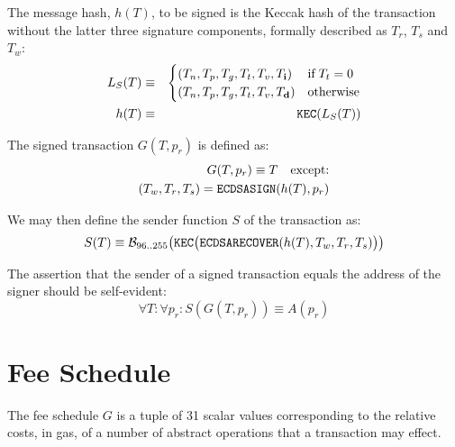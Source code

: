 \documentclass[9pt,oneside]{amsart}
\begin{document}
The message hash, $h(T)$, to be signed is the Keccak hash of the transaction without the latter three signature components, formally described as $T_r$, $T_s$ and $T_w$:
\begin{eqnarray}
L_S(T) & \equiv & \begin{cases}
(T_n, T_p, T_g, T_t, T_v, T_\mathbf{i}) & \text{if} \; T_t = 0\\
(T_n, T_p, T_g, T_t, T_v, T_\mathbf{d}) & \text{otherwise}
\end{cases} \\
h(T) & \equiv & \mathtt{\small KEC}( L_S(T) )
\end{eqnarray}

The signed transaction $G(T, p_r)$ is defined as:
\begin{eqnarray}
G(T, p_r) \equiv T \quad \text{except:} \\
(T_w, T_r, T_s) = \mathtt{\small ECDSASIGN}(h(T), p_r)
\end{eqnarray}

We may then define the sender function $S$ of the transaction as:
\begin{equation}
S(T) \equiv \mathcal{B}_{96..255}\big(\mathtt{\tiny KEC}\big( \mathtt{\small ECDSARECOVER}(h(T), T_w, T_r, T_s) \big) \big)
\end{equation}

The assertion that the sender of a signed transaction equals the address of the signer should be self-evident:
\begin{equation}
\forall T: \forall p_r: S(G(T, p_r)) \equiv A(p_r)
\end{equation}

\section{Fee Schedule}\label{app:fees}

The fee schedule $G$ is a tuple of 31 scalar values corresponding to the relative costs, in gas, of a number of abstract operations that a transaction may effect.
\end{document}
